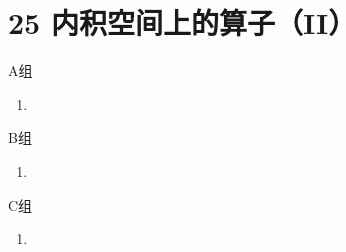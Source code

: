 \section*{25 内积空间上的算子（II）}

\vspace{2ex}

\centerline{\heiti A组}
\begin{enumerate}
    \item
\end{enumerate}

\centerline{\heiti B组}
\begin{enumerate}
    \item
\end{enumerate}

\centerline{\heiti C组}
\begin{enumerate}
    \item
\end{enumerate}

\clearpage
